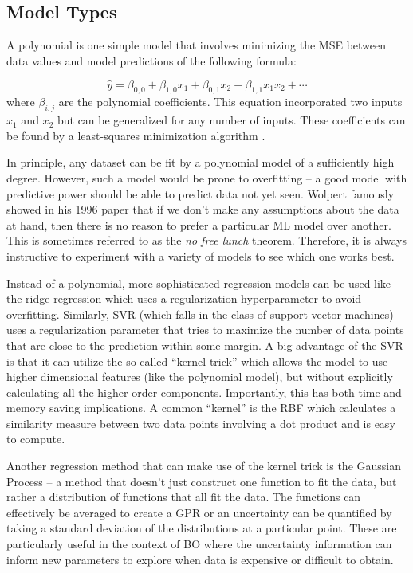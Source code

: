 \subsection{Model Types}

A polynomial is one simple model that involves minimizing the \gls{MSE} between data values and model predictions of the following formula: 

\begin{equation}
	\hat{y} = \beta_{0,0} + \beta_{1,0} x_1 + \beta_{0,1} x_2 + \beta_{1,1} x_1 x_2 + \cdots
\end{equation}
where $\beta_{i,j}$ are the polynomial coefficients. This equation incorporated two inputs $x_1$ and $x_2$ but can be generalized for any number of inputs. These coefficients can be found by a least-squares minimization algorithm \cite{Geron_2023_ML}. 

In principle, any dataset can be fit by a polynomial model of a sufficiently high degree. However, such a model would be prone to overfitting -- a good model with predictive power should be able to predict data not yet seen. Wolpert \cite{Wolpert_1997_IEEE} famously showed in his 1996 paper that if we don't make any assumptions about the data at hand, then there is no reason to prefer a particular \gls{ML} model over another. This is sometimes referred to as the \emph{no free lunch} theorem. Therefore, it is always instructive to experiment with a variety of models to see which one works best. 

Instead of a polynomial, more sophisticated regression models can be used like the ridge regression which uses a regularization hyperparameter to avoid overfitting. Similarly, \gls{SVR} (which falls in the class of support vector machines) uses a regularization parameter that tries to maximize the number of data points that are close to the prediction within some margin. A big advantage of the \gls{SVR} is that it can utilize the so-called ``kernel trick'' which allows the model to use higher dimensional features (like the polynomial model), but without explicitly calculating all the higher order components. Importantly, this has both time and memory saving implications. A common ``kernel'' is the \gls{RBF} which calculates a similarity measure between two data points involving a dot product and is easy to compute. 

Another regression method that can make use of the kernel trick is the Gaussian Process -- a method that doesn't just construct one function to fit the data, but rather a distribution of functions that all fit the data. The functions can effectively be averaged to create a \gls{GPR} or an uncertainty can be quantified by taking a standard deviation of the distributions at a particular point. These are particularly useful in the context of \gls{BO} where the uncertainty information can inform new parameters to explore when data is expensive or difficult to obtain.

